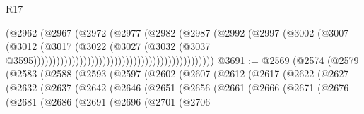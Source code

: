 \begin{lexlean}{R17}
\begin{coremodule}
                                                                  (@2962
                                                                    (@2967
                                                                      (@2972
                                                                        (@2977
                                                                          (@2982
                                                                            (@2987
                                                                              (@2992
                                                                                (@2997
                                                                                  (@3002
                                                                                    (@3007
                                                                                      (@3012
                                                                                        (@3017
                                                                                          (@3022
                                                                                            (@3027
                                                                                              (@3032
                                                                                                (@3037
                                                                                                  @3595)))))))))))))))))))))))))))))))))))))))))))))))
@3691 := @2569
    (@2574
      (@2579
        (@2583
          (@2588
            (@2593
              (@2597
                (@2602
                  (@2607
                    (@2612
                      (@2617
                        (@2622
                          (@2627
                            (@2632
                              (@2637
                                (@2642
                                  (@2646
                                    (@2651
                                      (@2656
                                        (@2661
                                          (@2666
                                            (@2671
                                              (@2676
                                                (@2681
                                                  (@2686
                                                    (@2691
                                                      (@2696
                                                        (@2701
                                                          (@2706

\end{coremodule}
\end{lexlean}
